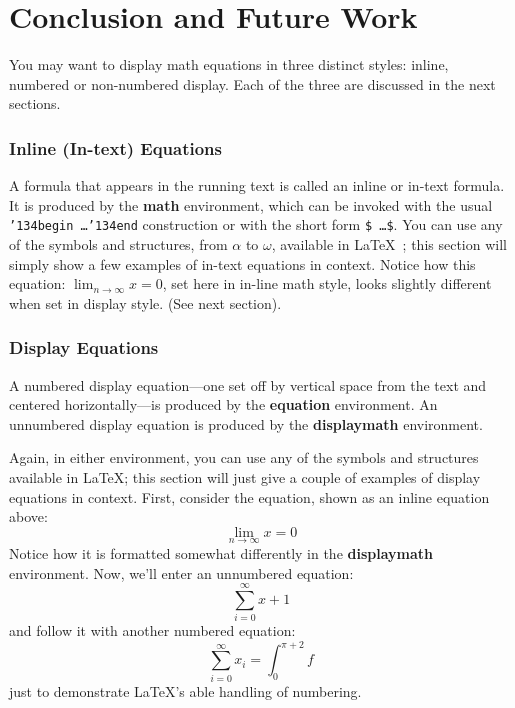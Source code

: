 \section{Conclusion and Future Work}



You may want to display math equations in three distinct styles:
inline, numbered or non-numbered display.  Each of
the three are discussed in the next sections.

\subsubsection{Inline (In-text) Equations}
A formula that appears in the running text is called an
inline or in-text formula.  It is produced by the
\textbf{math} environment, which can be
invoked with the usual \texttt{{\char'134}begin\,\ldots{\char'134}end}
construction or with the short form \texttt{\$\,\ldots\$}. You
can use any of the symbols and structures,
from $\alpha$ to $\omega$, available in
\LaTeX~\cite{Lamport:LaTeX}; this section will simply show a
few examples of in-text equations in context. Notice how
this equation:
\begin{math}
  \lim_{n\rightarrow \infty}x=0
\end{math},
set here in in-line math style, looks slightly different when
set in display style.  (See next section).

\subsubsection{Display Equations}
A numbered display equation---one set off by vertical space from the
text and centered horizontally---is produced by the \textbf{equation}
environment. An unnumbered display equation is produced by the
\textbf{displaymath} environment.

Again, in either environment, you can use any of the symbols
and structures available in \LaTeX\@; this section will just
give a couple of examples of display equations in context.
First, consider the equation, shown as an inline equation above:
\begin{equation}
  \lim_{n\rightarrow \infty}x=0
\end{equation}
Notice how it is formatted somewhat differently in
the \textbf{displaymath}
environment.  Now, we'll enter an unnumbered equation:
\begin{displaymath}
  \sum_{i=0}^{\infty} x + 1
\end{displaymath}
and follow it with another numbered equation:
\begin{equation}
  \sum_{i=0}^{\infty}x_i=\int_{0}^{\pi+2} f
\end{equation}
just to demonstrate \LaTeX's able handling of numbering.

